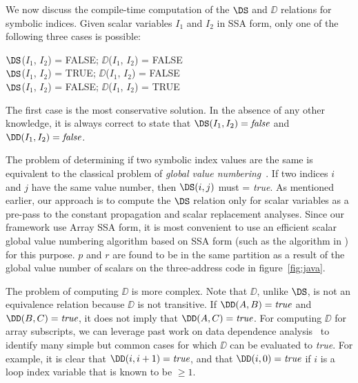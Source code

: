 {We now discuss the compile-time
computation of the $\DS$ and $\DD$ relations for symbolic
indices. 
Given scalar variables $I_1$ and $I_2$
in SSA form, only one of the following three cases
is possible:
\begin{center}
\parbox{2.5in}{
\begin{programa}
$\DS$($I_1$, $I_2$) = FALSE; $\DD$($I_1$, $I_2$) = FALSE \\
$\DS$($I_1$, $I_2$) = TRUE; $\DD$($I_1$, $I_2$) = FALSE \\
$\DS$($I_1$, $I_2$) = FALSE; $\DD$($I_1$, $I_2$) = TRUE \\
\end{programa}
}
\end{center}
The first case is the most conservative solution.  In the absence of
any other knowledge, it is always correct to state that
$\DS(I_1,I_2) = \mbox{\it false}$ and $\DD(I_1,I_2) = \mbox{\it
false}$.

The problem of determining if two symbolic index values are the same
is equivalent to the classical problem of {\it global value
numbering}~\cite{AlWZ88,Much97}. If two indices $i$ and $j$ have the
same value number, then $\DS(i,j)$ must = {\it true}.  As mentioned
earlier, our approach is to compute the $\DS$ relation only for scalar
variables as a pre-pass to the constant propagation and scalar
replacement analyses.  Since our framework use Array SSA form, it is
most convenient to use an efficient scalar global value numbering
algorithm based on SSA form (such as the algorithm in
\cite{AlWZ88}) for this purpose. $p$ and $r$ are found to be in the
same partition as a result of the global value number of scalars on
the three-address code in figure~\ref{fig:java}.


The problem of
computing $\DD$ is more complex.  Note that $\DD$, unlike $\DS$, is not
an equivalence relation because $\DD$ is not transitive.  If $\DD(A,
B)=\mbox{\it true}$ and $\DD(B, C)=\mbox{\it true}$, it does not imply
that $\DD(A, C)=\mbox{\it true}$.  For computing $\DD$ for array
subscripts, we can leverage past work on data dependence
analysis~\cite{Wolf89} to identify many simple but common cases for
which $\DD$ can be evaluated to {\it true}.  For example, it is clear
that $\DD(i, i+1) = \mbox{\it true}$, and that $\DD(i, 0) = \mbox{\it
true}$ if $i$ is a loop index variable that is known to be $\geq 1$.

}
